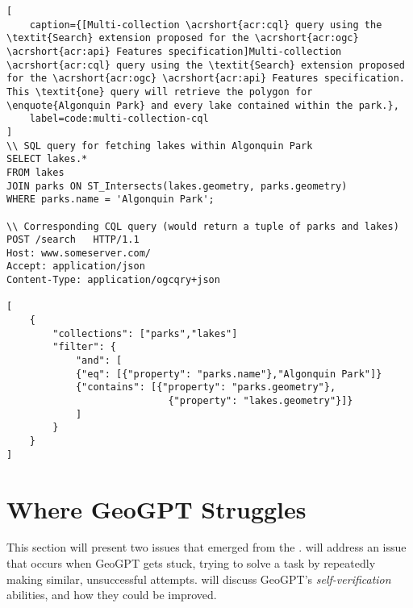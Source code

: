 \begin{lstlisting}[
    caption={[Multi-collection \acrshort{acr:cql} query using the \textit{Search} extension proposed for the \acrshort{acr:ogc} \acrshort{acr:api} Features specification]Multi-collection \acrshort{acr:cql} query using the \textit{Search} extension proposed for the \acrshort{acr:ogc} \acrshort{acr:api} Features specification. This \textit{one} query will retrieve the polygon for \enquote{Algonquin Park} and every lake contained within the park.},
    label=code:multi-collection-cql
]
\\ SQL query for fetching lakes within Algonquin Park
SELECT lakes.*
FROM lakes
JOIN parks ON ST_Intersects(lakes.geometry, parks.geometry)
WHERE parks.name = 'Algonquin Park';

\\ Corresponding CQL query (would return a tuple of parks and lakes)
POST /search   HTTP/1.1                                           
Host: www.someserver.com/                                         
Accept: application/json                                          
Content-Type: application/ogcqry+json                             
                                                                    
[                                                                 
    {                                                              
        "collections": ["parks","lakes"]                            
        "filter": {                                                 
            "and": [                                                 
            {"eq": [{"property": "parks.name"},"Algonquin Park"]} 
            {"contains": [{"property": "parks.geometry"},         
                            {"property": "lakes.geometry"}]}        
            ]                                                        
        }                                                           
    }                                                              
]
\end{lstlisting}


\section[Where GeoGPT Struggles]{Where GeoGPT Struggles}
\label{sec:autonomous-gis-struggles}

This section will present two issues that emerged from the .  will address an issue that occurs when GeoGPT gets stuck, trying to solve a task by repeatedly making similar, unsuccessful attempts.  will discuss GeoGPT's \textit{self-verification} abilities, and how they could be improved.

